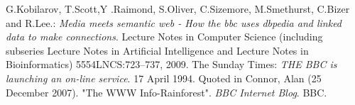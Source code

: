 \documentclass{llncs}
\begin{document}
%

%
%
\begin{thebibliography}{5}
%
  G.Kobilarov, T.Scott,Y .Raimond, S.Oliver, C.Sizemore, M.Smethurst, C.Bizer and R.Lee.:
  \textit{Media meets semantic web - How the bbc uses dbpedia and linked data to make connections}.
  Lecture Notes in Computer Science (including subseries Lecture Notes in Artiﬁcial Intelligence and Lecture Notes in Bioinformatics)
  5554LNCS:723–737, 2009.
%
  The Sunday Times:
  \textit{THE BBC is launching an on-line service}. 17 April 1994.
  Quoted in Connor, Alan (25 December 2007). "The WWW Info-Rainforest". \textit{BBC Internet Blog}. BBC.

\end{thebibliography}
\end{document}
